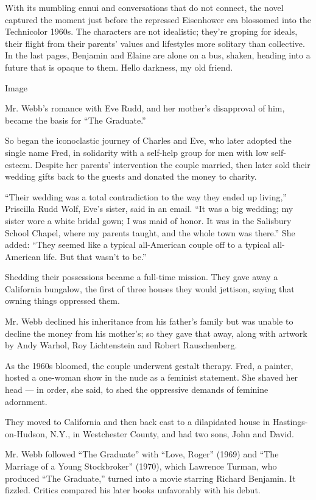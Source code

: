 With its mumbling ennui and conversations that do not connect, the novel
captured the moment just before the repressed Eisenhower era blossomed
into the Technicolor 1960s. The characters are not idealistic; they're
groping for ideals, their flight from their parents' values and
lifestyles more solitary than collective. In the last pages, Benjamin
and Elaine are alone on a bus, shaken, heading into a future that is
opaque to them. Hello darkness, my old friend.

Image

Mr. Webb's romance with Eve Rudd, and her mother's disapproval of him,
became the basis for ``The Graduate.''

So began the iconoclastic journey of Charles and Eve, who later adopted
the single name Fred, in solidarity with a self-help group for men with
low self-esteem. Despite her parents' intervention the couple married,
then later sold their wedding gifts back to the guests and donated the
money to charity.

``Their wedding was a total contradiction to the way they ended up
living,'' Priscilla Rudd Wolf, Eve's sister, said in an email. ``It was
a big wedding; my sister wore a white bridal gown; I was maid of honor.
It was in the Salisbury School Chapel, where my parents taught, and the
whole town was there.'' She added: ``They seemed like a typical
all-American couple off to a typical all-American life. But that wasn't
to be.''

Shedding their possessions became a full-time mission. They gave away a
California bungalow, the first of three houses they would jettison,
saying that owning things oppressed them.

Mr. Webb declined his inheritance from his father's family but was
unable to decline the money from his mother's; so they gave that away,
along with artwork by Andy Warhol, Roy Lichtenstein and Robert
Rauschenberg.

As the 1960s bloomed, the couple underwent gestalt therapy. Fred, a
painter, hosted a one-woman show in the nude as a feminist statement.
She shaved her head --- in order, she said, to shed the oppressive
demands of feminine adornment.

They moved to California and then back east to a dilapidated house in
Hastings-on-Hudson, N.Y., in Westchester County, and had two sons, John
and David.

Mr. Webb followed ``The Graduate'' with ``Love, Roger'' (1969) and ``The
Marriage of a Young Stockbroker'' (1970), which Lawrence Turman, who
produced ``The Graduate,'' turned into a movie starring Richard
Benjamin. It fizzled. Critics compared his later books unfavorably with
his debut.

